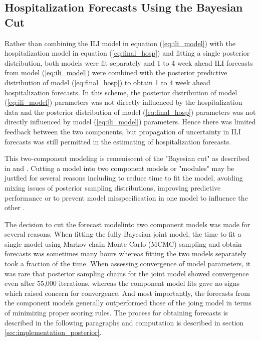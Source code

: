 \subsection{Hospitalization Forecasts Using the Bayesian Cut}

Rather than combining the ILI model in equation (\ref{eq:ili_model}) with the 
hospitalization model in equation (\ref{eq:final_hosp}) and fitting a single
posterior distribution, both models were fit separately and 1 to 4 week ahead
ILI forecasts from model (\ref{eq:ili_model}) were combined with the posterior
predictive distribution of model (\ref{eq:final_hosp}) to obtain 1 to 4 week
ahead hospitalization forecasts. In this scheme, the posterior distribution of 
model (\ref{eq:ili_model}) parameters was not directly influenced by the 
hospitalization data and the posterior distribution of model 
(\ref{eq:final_hosp}) parameters was not directly influenced by model 
(\ref{eq:ili_model}) parameters. Hence there was limited feedback between the
two components, but propagation of uncertainty in ILI forecasts was still 
permitted in the estimating of hospitalization forecasts.

This two-component modeling is remeniscent of the "Bayesian cut" as 
described in \cite{plummer2015cuts} and \cite{nott2023bayesian}. Cutting a model
into two component models or "modules" may be justfied for several reasons
including to reduce time to fit the model, avoiding mixing issues of posterior
sampling distributions, improving predictive performance or to prevent
model misspecification in one model to influence the other 
\cite[]{nott2023bayesian, jacob2020unbiased, jacob2017better, plummer2015cuts}.

The decision to cut the forecast modelinto two component models
was made for several reasons.
When fitting the fully Bayesian joint model, the time to fit a single model using
Markov chain Monte Carlo (MCMC) sampling and
obtain forecasts was sometimes many hours whereas fitting the two models
separately took a fraction of the time. When assessing convergence of model
parameters, it was rare that posterior sampling chains for the joint model
showed convergence even after 55,000 iterations, whereas the component model 
fits gave no signs which raised concern for convergence. And most importantly,
the forecasts from the component models generally outperformed those of the 
joing model in terms of minimizing proper scoring rules. 
The process for obtaining forecasts is described in the following paragraphs 
and computation is described in section \ref{sec:implementation_posterior}.


